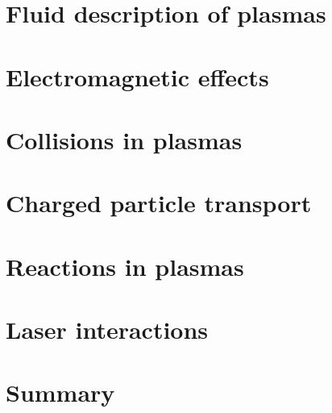 

\section{Fluid description of plasmas}
\label{sect:plasma_fluid}


\section{Electromagnetic effects}
\label{sect:plasma_em}


\section{Collisions in plasmas}
\label{sect:plasma_collisions}


\section{Charged particle transport}
\label{sect:plasma_transport}


\section{Reactions in plasmas}
\label{sect:plasma_reactions}


\section{Laser interactions}
\label{sect:plasma_laser}


\section{Summary}
\label{sect:plasma_summary}
